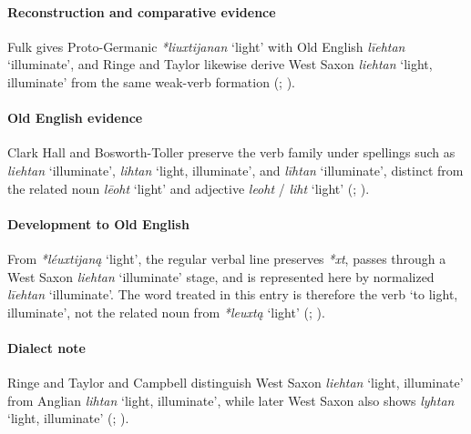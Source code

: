 \documentclass[
  british,
  a4paper,
]{article}
\providecommand{\Recon}[1]{\emph{*#1}}
\begin{document}
\paragraph{Reconstruction and comparative
evidence}\label{reconstruction-and-comparative-evidence-39}

Fulk gives Proto-Germanic \Recon{liuxtijanan} `light' with Old English
\emph{līehtan} `illuminate', and Ringe and Taylor likewise derive West
Saxon {\emph{liehtan}} `light, illuminate' from the same weak-verb
formation (;
).

\paragraph{Old English evidence}\label{old-english-evidence-39}

Clark Hall and Bosworth-Toller preserve the verb family under spellings
such as \emph{liehtan} `illuminate', {\emph{lihtan}} `light,
illuminate', and \emph{līhtan} `illuminate', distinct from the related
noun \emph{lēoht} `light' and adjective \emph{leoht} / \emph{liht}
`light' (;
).

\paragraph{Development to Old
English}\label{development-to-old-english-39}

From \Recon{léuxtijaną} `light', the regular verbal line preserves
\emph{*xt}, passes through a West Saxon \emph{liehtan} `illuminate'
stage, and is represented here by normalized \emph{līehtan}
`illuminate'. The word treated in this entry is therefore the verb `to
light, illuminate', not the related noun from \Recon{leuxtą} `light'
(;
).

\paragraph{Dialect note}\label{dialect-note-3}

Ringe and Taylor and Campbell distinguish West Saxon {\emph{liehtan}}
`light, illuminate' from Anglian {\emph{lihtan}} `light, illuminate',
while later West Saxon also shows {\emph{lyhtan}} `light, illuminate'
(;
).
\end{document}
